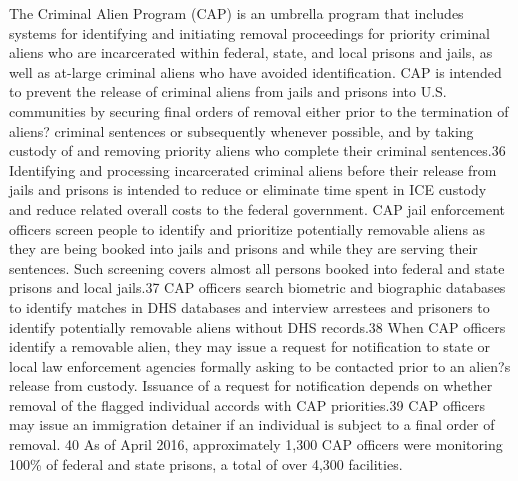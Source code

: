 The Criminal Alien Program (CAP) is an umbrella program that includes systems for identifying
and initiating removal proceedings for priority criminal aliens who are incarcerated within
federal, state, and local prisons and jails, as well as at-large criminal aliens who have avoided identification. CAP is intended to prevent the release of criminal aliens from jails and prisons into
U.S. communities by securing final orders of removal either prior to the termination of aliens?
criminal sentences or subsequently whenever possible, and by taking custody of and removing
priority aliens who complete their criminal sentences.36 Identifying and processing incarcerated
criminal aliens before their release from jails and prisons is intended to reduce or eliminate time
spent in ICE custody and reduce related overall costs to the federal government.
CAP jail enforcement officers screen people to identify and prioritize potentially removable aliens
as they are being booked into jails and prisons and while they are serving their sentences. Such
screening covers almost all persons booked into federal and state prisons and local jails.37 CAP
officers search biometric and biographic databases to identify matches in DHS databases and
interview arrestees and prisoners to identify potentially removable aliens without DHS records.38
When CAP officers identify a removable alien, they may issue a request for notification to state
or local law enforcement agencies formally asking to be contacted prior to an alien?s release from
custody. Issuance of a request for notification depends on whether removal of the flagged
individual accords with CAP priorities.39 CAP officers may issue an immigration detainer if an
individual is subject to a final order of removal.
40
As of April 2016, approximately 1,300 CAP officers were monitoring 100\% of federal and state
prisons, a total of over 4,300 facilities.



